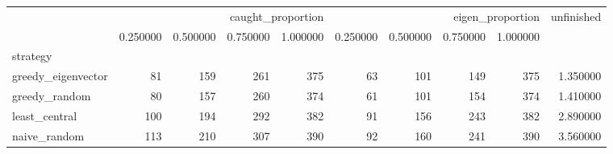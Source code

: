 \begin{tabular}{lrrrrrrrrr}
 & \multicolumn{4}{r}{caught_proportion} & \multicolumn{4}{r}{eigen_proportion} & unfinished \\
 & 0.250000 & 0.500000 & 0.750000 & 1.000000 & 0.250000 & 0.500000 & 0.750000 & 1.000000 &  \\
strategy &  &  &  &  &  &  &  &  &  \\
greedy_eigenvector & 81 & 159 & 261 & 375 & 63 & 101 & 149 & 375 & 1.350000 \\
greedy_random & 80 & 157 & 260 & 374 & 61 & 101 & 154 & 374 & 1.410000 \\
least_central & 100 & 194 & 292 & 382 & 91 & 156 & 243 & 382 & 2.890000 \\
naive_random & 113 & 210 & 307 & 390 & 92 & 160 & 241 & 390 & 3.560000 \\
\end{tabular}
